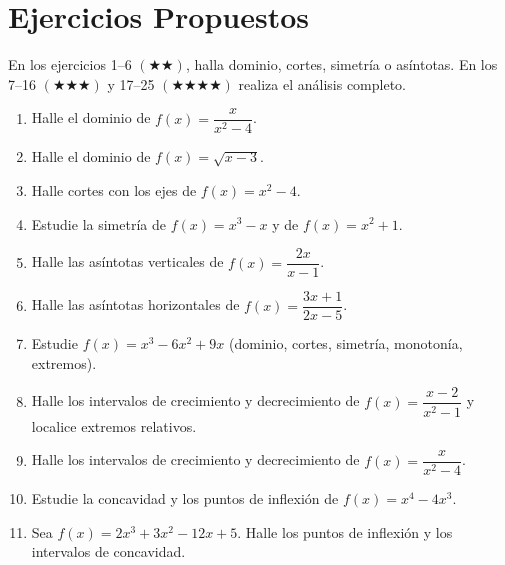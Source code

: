 \documentclass[12pt, letterpaper]{article}
\begin{document}
\newpage
\section{Ejercicios Propuestos}

\noindent En los ejercicios 1--6 $(\bigstar\bigstar)$, halla dominio, cortes, simetría o asíntotas. En los 7--16 $(\bigstar\bigstar\bigstar)$ y 17--25 $(\bigstar\bigstar\bigstar\bigstar)$ realiza el análisis completo.

\begin{enumerate}[leftmargin=*]

  \item \medio{} Halle el dominio de $f(x) = \dfrac{x}{x^2 - 4}$.

  \item \medio{} Halle el dominio de $f(x) = \sqrt{x - 3}$.

  \item \medio{} Halle cortes con los ejes de $f(x) = x^2 - 4$.

  \item \medio{} Estudie la simetría de $f(x) = x^3 - x$ y de $f(x) = x^2 + 1$.

  \item \medio{} Halle las asíntotas verticales de $f(x) = \dfrac{2x}{x - 1}$.

  \item \medio{} Halle las asíntotas horizontales de $f(x) = \dfrac{3x + 1}{2x - 5}$.

  \item \dificil{} Estudie $f(x) = x^3 - 6x^2 + 9x$ (dominio, cortes, simetría, monotonía, extremos).

  \item \dificil{} Halle los intervalos de crecimiento y decrecimiento de $f(x) = \dfrac{x - 2}{x^2 - 1}$ y localice extremos relativos. %

  \item \dificil{} Halle los intervalos de crecimiento y decrecimiento de $f(x) = \dfrac{x}{x^2 - 4}$.

  \item \dificil{} Estudie la concavidad y los puntos de inflexión de $f(x) = x^4 - 4x^3$.

  \item \dificil{} Sea $f(x) = 2x^3 + 3x^2 - 12x + 5$. Halle los puntos de inflexión y los intervalos de concavidad. %


\end{enumerate}
\end{document}
